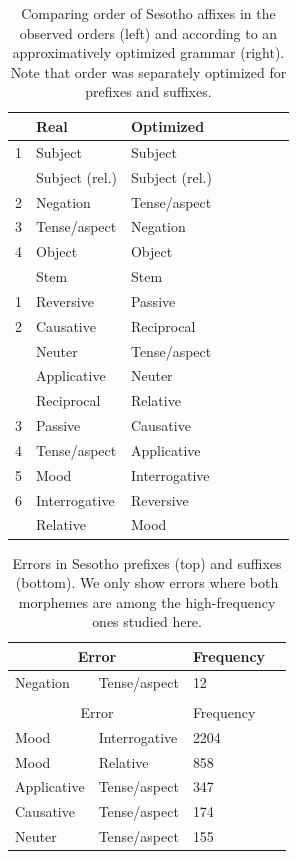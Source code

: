 \begin{table}
    \centering
    \begin{tabular}{llllllll}
	    &	    Real & Optimized \\ \hline\hline
	    1 & Subject & Subject \\
	      & Subject (rel.) & Subject (rel.) \\
	    2 & Negation & Tense/aspect \\
	    3& Tense/aspect & Negation \\
	    4 &Object & Object \\ \hline
	    &Stem & Stem  \\ \hline
	    1 & Reversive & Passive \\
	    2& Causative & Reciprocal \\
	    &Neuter & Tense/aspect \\
	    &Applicative & Neuter \\
	    &Reciprocal & Relative \\
	    3&Passive & Causative \\
	    4&Tense/aspect & Applicative \\
	    5&Mood & Interrogative \\
	    6&Interrogative & Reversive \\
	    &Relative & Mood \\ \hline
    \end{tabular}
	\caption{Comparing order of Sesotho affixes in the observed orders (left) and according to an approximatively optimized grammar (right). Note that order was separately optimized for prefixes and suffixes.}
    \label{tab:grammar-table-sesotho}
\end{table}

\begin{table}
    \centering
    \begin{tabular}{ll|ll}
    \multicolumn{2}{c|}{Error} & Frequency \\ \hline\hline
Negation & Tense/aspect & 12 \\
\\
    \multicolumn{2}{c|}{Error} & Frequency \\ \hline\hline
Mood & Interrogative & 2204 \\
Mood & Relative & 858 \\
Applicative & Tense/aspect & 347 \\
Causative & Tense/aspect & 174 \\
Neuter & Tense/aspect & 155 \\
\end{tabular}
    \caption{Errors in Sesotho prefixes (top) and suffixes (bottom). %
    We only show errors where both morphemes are among the high-frequency ones studied here.}
    \label{tab:sesotho-prefix-err-analysis}
\end{table}






